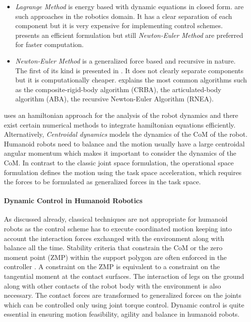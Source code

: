 \begin{itemize}
    \item \textit{Lagrange Method} is energy based with dynamic equations in closed form. \cite{uicker1969dynamic,kahn1969near,bejczy1974robot} are such approaches in the robotics domain. It has a clear separation of each component but it is very expensive  for implementing control schemes. \cite{hollerbach1980recursive} presents an efficient formulation but still \textit{Newton-Euler Method} are preferred for faster computation.
    \item \textit{Newton-Euler Method} is a generalized force based and recursive in nature. The first of its kind is presented in \cite{orin1979kinematic}. It does not clearly separate components but it is computationally cheaper. \cite{Featherstone2009} explains the most common algorithms such as the composite-rigid-body algorithm (CRBA), the articulated-body algorithm (ABA), the recursive Newton-Euler Algorithm (RNEA). 
\end{itemize}
\cite{spong1992remarks} uses an hamiltonian approach for the analysis of the robot dynamics and there exist certain numerical methods to integrate hamiltonian equations efficiently. Alternatively, \textit{Centroidal dynamics} \cite{orin2013centroidal,orin2008centroidal} models the dynamics of the CoM of the robot. Humanoid robots need to balance and the motion
usually have a large centroidal angular momentum which makes it important to 
consider the dynamics of the CoM. In contrast to the classic joint space formulation, the operational space formulation \cite{Khatib1987} defines the motion using the task space acceleration, which requires the forces to be formulated as generalized forces in the task space.

\paragraph{Dynamic Control in Humanoid Robotics}
As discussed already, classical techniques are not appropriate for humanoid robots as the control scheme has to execute coordinated motion keeping into account the interaction forces exchanged with the environment along with balance all the time. Stability criteria that constrain the CoM or the zero moment point (ZMP) within the support polygon are often enforced in the controller \cite{wieber2002stability}. A constraint on the ZMP is equivalent to a constraint on the tangential moment at the contact surfaces. The interaction of legs on the ground along with other contacts of the robot body with the environment is also necessary. The contact forces are transformed to generalized forces on the joints which can be controlled only using joint torque control. Dynamic control is quite essential in ensuring motion feasibility, agility and balance in 
humanoid robots.

